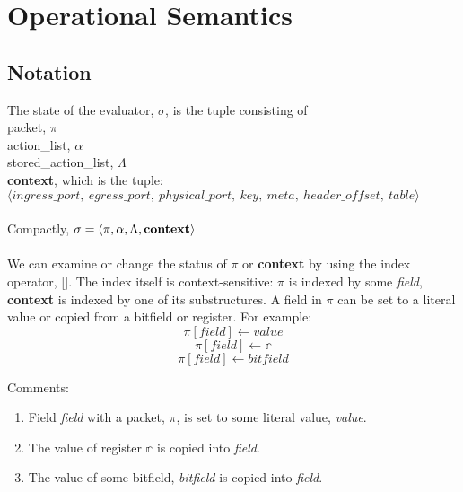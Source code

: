 
\section{Operational Semantics}

\subsection{Notation}

The state of the evaluator, $\sigma$, is the tuple consisting of \\
packet, $\pi$\\
action\_list, $\alpha$ \\
stored\_action\_list, $\Lambda$ \\
\textbf{context}, which is the tuple: \\
$\langle ingress\_port, \ egress\_port, \ physical\_port, \ key, \ meta, \ header\_offset, \ table \rangle$ \\ \\
Compactly, $\sigma = \langle \pi, \alpha, \Lambda, \textbf{\textrm{context}} \rangle$
\\ \\
We can examine or change the status of $\pi$ or \textbf{context} by using the index operator, []. The index itself is context-sensitive: $\pi$ is indexed by some \textit{field}, \textbf{context} is indexed by one of its substructures.
A field in $\pi$ can be set to a literal value or copied from a bitfield or register. For example:
\begin{equation}
  \pi[\textit{field}] \leftarrow \textit{value}
\end{equation}
\begin{equation}
  \pi[\textit{field}] \leftarrow \mathbb{r}
\end{equation}
\begin{equation}
  \pi[\textit{field}] \leftarrow \textit{bitfield}
\end{equation}

Comments:
\begin{enumerate}
\item Field \textit{field} with a packet, $\pi$, is set to some literal value, \textit{value}.
\item The value of register $\mathbb{r}$ is copied into \textit{field}.
\item The value of some bitfield, \textit{bitfield} is copied into \textit{field}.
\end{enumerate}


